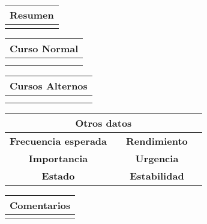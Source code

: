 \begin{table}[!h]
\begin{tabular}{|c|}
\hline
\textbf{Resumen}  \\
\hline
                   \\
\hline
\end{tabular}
\end{table}

\begin{table}[!h]
\begin{tabular}{|c|c|c|c|}
\hline
\multicolumn{4}{|c|}{Curso Normal} \\
\hline
              &               &              &              \\
\hline
              &               &              &              \\
\hline
\end{tabular}
\end{table}

\begin{table}[!h]
\begin{tabular}{|c|c|}
\hline
\multicolumn{2}{|c|}{Cursos Alternos} \\
\hline
              &              \\
\hline
              &              \\
\hline
\end{tabular}
\end{table}

\begin{table}[!h]
\begin{tabular}{|c|c|c|c|}
\hline
\multicolumn{4}{|c|}{Otros datos} \\
\hline
 \textbf{Frecuencia esperada}             &               &    \textbf{Rendimiento}          &              \\
\hline
 \textbf{Importancia}             &               &     \textbf{Urgencia}         &              \\
\hline
 \textbf{Estado}             &               &    \textbf{Estabilidad}          &              \\
\hline
\end{tabular}
\end{table}


\begin{table}[!h]
\begin{tabular}{|c|}
\hline
\textbf{Comentarios} \\
\hline
                  \\
\hline
\end{tabular}
\end{table}